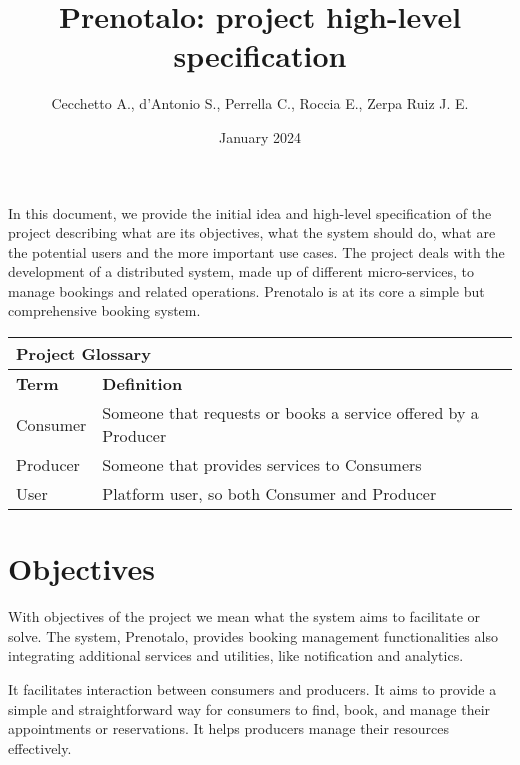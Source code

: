 \documentclass{article}
\title{Prenotalo: project high-level specification}
\author{Cecchetto A., d'Antonio S., Perrella C., Roccia E., Zerpa Ruiz J. E.}
\date{January 2024}
\begin{document}
\maketitle

In this document, we provide the initial idea and high-level specification of the project describing what are its objectives, what the system should do, what are the potential users and the more important use cases. The project deals with the development of a distributed system, made up of different micro-services, to manage bookings and related operations. Prenotalo is at its core a simple but comprehensive booking system.
\begin{table}[!h]
\centering
\begin{tabular}{l l}
\multicolumn{2}{l}{\textbf{Project Glossary}} \\
\hline
\textbf{Term} & \textbf{Definition} \\
\hline
Consumer & Someone that requests or books a service offered by a Producer \\
\hline
Producer & Someone that provides services to Consumers \\
\hline
User & Platform user, so both Consumer and Producer \\
\hline
\end{tabular}

\end{table}

\begin{comment}
The aim of this project is to create a distributed system, made up of different
micro-services, that primarily provides booking management functionalities
and also integrating additional services and utilities.
\end{comment}

\section{Objectives}
With objectives of the project we mean what the system aims to facilitate or solve. The system, Prenotalo, provides booking management functionalities also integrating additional services and utilities, like notification and analytics.

It facilitates interaction between consumers and producers. It aims to provide a simple and straightforward way for consumers to find, book, and manage their appointments or reservations. It helps producers manage their resources effectively.
\end{document}
